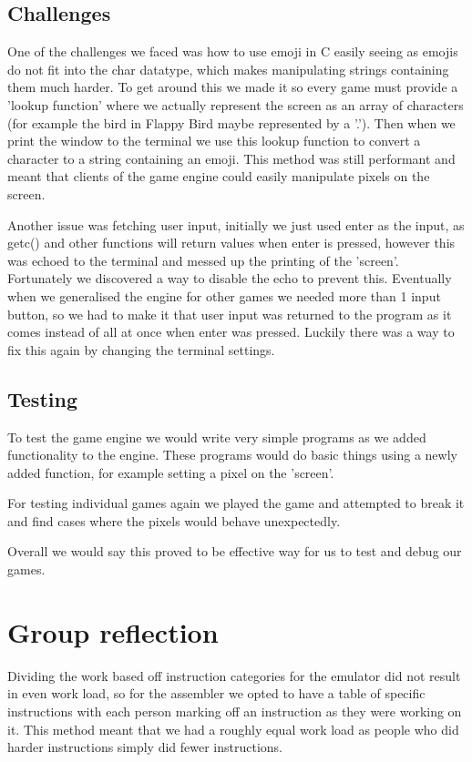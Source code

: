 \documentclass{article}
\begin{document}
\subsection{Challenges}
One of the challenges we faced was how to use emoji in C easily seeing as emojis do not fit into the char datatype, which makes manipulating strings containing them much harder. To get around this we made it so every game must provide a 'lookup function' where we actually represent the screen as an array of characters (for example the bird in Flappy Bird maybe represented by a '.'). Then when we print the window to the terminal we use this lookup function to convert a character to a string containing an emoji. This method was still performant and meant that clients of the game engine could easily manipulate pixels on the screen.

Another issue was fetching user input, initially we just used enter as the input, as getc() and other functions will return values when enter is pressed, however this was echoed to the terminal and messed up the printing of the 'screen'. Fortunately we discovered a way to disable the echo to prevent this. Eventually when we generalised the engine for other games we needed more than 1 input button, so we had to make it that user input was returned to the program as it comes instead of all at once when enter was pressed. Luckily there was a way to fix this again by changing the terminal settings.

\subsection{Testing}
To test the game engine we would write very simple programs as we added functionality to the engine. These programs would do basic things using a newly added function, for example setting a pixel on the 'screen'. 

For testing individual games again we played the game and attempted to break it and find cases where the pixels would behave unexpectedly.

Overall we would say this proved to be effective way for us to test and debug our games.

\section{Group reflection}
Dividing the work based off instruction categories for the emulator did not result in even work load, so for the assembler we opted to have a table of specific instructions with each person marking off an instruction as they were working on it. This method meant that we had a roughly equal work load as people who did harder instructions simply did fewer instructions.
\end{document}
